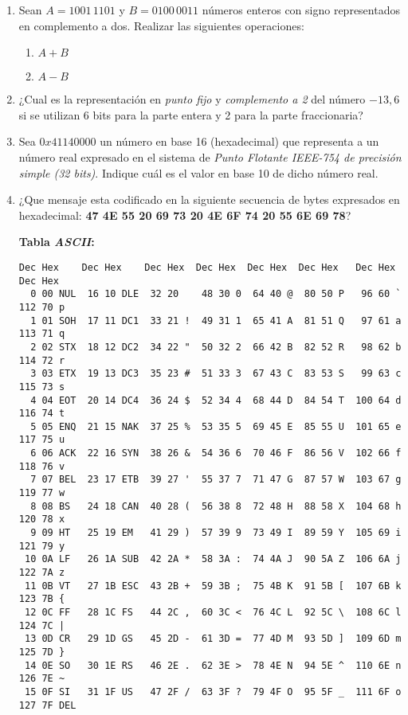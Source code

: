 \documentclass[12pt]{article}
\begin{document}
\begin{enumerate}

    \item Sean $A=1001\,1101$ y $B=0100\,0011$ números enteros con signo
        representados en complemento a dos. Realizar las siguientes
        operaciones:

        \begin{enumerate}

            \item $A+B$

            \item $A-B$

        \end{enumerate}

    \item ¿Cual es la representación en \emph{punto fijo} y \emph{complemento
        a 2} del número $-13,6$ si se utilizan 6 bits para la parte entera y 2
        para la parte fraccionaria?

    \item Sea $0x41140000$ un número en base 16 (hexadecimal) que representa a
        un número real expresado en el sistema de \emph{Punto Flotante
        IEEE-754 de precisión simple (32 bits)}. Indique cuál es el valor en
        base 10 de dicho número real.

    \item ¿Que mensaje esta codificado en la siguiente secuencia de bytes
        expresados en hexadecimal: \textbf{47 4E 55 20 69 73 20 4E  6F 74 20
        55 6E 69 78}?

\textbf{Tabla \emph{ASCII}:}

\begin{verbatim}
Dec Hex    Dec Hex    Dec Hex  Dec Hex  Dec Hex  Dec Hex   Dec Hex   Dec Hex
  0 00 NUL  16 10 DLE  32 20    48 30 0  64 40 @  80 50 P   96 60 `  112 70 p
  1 01 SOH  17 11 DC1  33 21 !  49 31 1  65 41 A  81 51 Q   97 61 a  113 71 q
  2 02 STX  18 12 DC2  34 22 "  50 32 2  66 42 B  82 52 R   98 62 b  114 72 r
  3 03 ETX  19 13 DC3  35 23 #  51 33 3  67 43 C  83 53 S   99 63 c  115 73 s
  4 04 EOT  20 14 DC4  36 24 $  52 34 4  68 44 D  84 54 T  100 64 d  116 74 t
  5 05 ENQ  21 15 NAK  37 25 %  53 35 5  69 45 E  85 55 U  101 65 e  117 75 u
  6 06 ACK  22 16 SYN  38 26 &  54 36 6  70 46 F  86 56 V  102 66 f  118 76 v
  7 07 BEL  23 17 ETB  39 27 '  55 37 7  71 47 G  87 57 W  103 67 g  119 77 w
  8 08 BS   24 18 CAN  40 28 (  56 38 8  72 48 H  88 58 X  104 68 h  120 78 x
  9 09 HT   25 19 EM   41 29 )  57 39 9  73 49 I  89 59 Y  105 69 i  121 79 y
 10 0A LF   26 1A SUB  42 2A *  58 3A :  74 4A J  90 5A Z  106 6A j  122 7A z
 11 0B VT   27 1B ESC  43 2B +  59 3B ;  75 4B K  91 5B [  107 6B k  123 7B {
 12 0C FF   28 1C FS   44 2C ,  60 3C <  76 4C L  92 5C \  108 6C l  124 7C |
 13 0D CR   29 1D GS   45 2D -  61 3D =  77 4D M  93 5D ]  109 6D m  125 7D }
 14 0E SO   30 1E RS   46 2E .  62 3E >  78 4E N  94 5E ^  110 6E n  126 7E ~
 15 0F SI   31 1F US   47 2F /  63 3F ?  79 4F O  95 5F _  111 6F o  127 7F DEL
\end{verbatim}


\end{enumerate}
\end{document}

